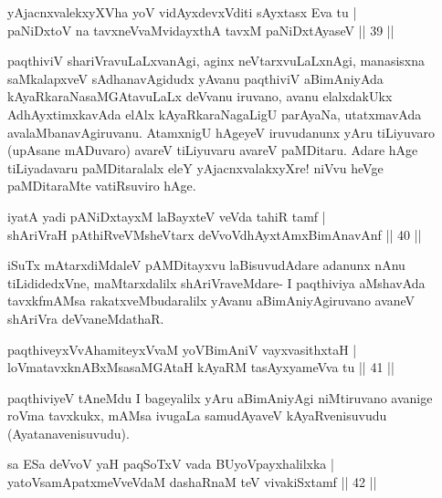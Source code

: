 \begin{shl}
yAjacnxvalekxyXVha yoV vidAyxdevxVditi sAyxtasx Eva tu |\\
paNiDxtoV na tavxneVvaMvidayxthA tavxM paNiDxtAyaseV \hfill || 39 ||
\end{shl}

\begin{artha}
paqthiviV shariVravuLaLxvanAgi, aginx neVtarxvuLaLxnAgi, manasisxna saMkalapxveV sAdhana\-vAgidudx yAvanu paqthiviV aBimAniyAda kAyaRkaraNasaMGAtavuLaLx deVvanu iruvano, avanu elalxdakUkx AdhAyxtimxkavAda elAlx kAyaRkaraNagaLigU parAyaNa, utatxmavAda avalaMbanavAgiruvanu. AtamxnigU hAgeyeV iruvudanunx yAru tiLiyuvaro (upAsane mADuvaro) avareV tiLiyuvaru avareV paMDitaru. Adare hAge tiLiyadavaru paMDitaralalx eleY yAjacnxvalakxyXre! niVvu heVge paMDita\-raMte vatiRsuviro hAge.
\end{artha}


\begin{shl}
iyatA yadi pANiDxtayxM laBayxteV veVda tahiR tamf |\\
shAriVraH pAthiRveVM\s sheV\s tarx deVvoV\s dhAyxtAmxBimAnavAnf \hfill || 40 ||
\end{shl}

\begin{artha}
iSuTx mAtarxdiMdaleV pAMDitayxvu laBisuvudAdare adanunx nAnu tiLididedxVne, maMtarxdalilx shAriVraveMdare- I paqthiviya aMshavAda tavxkfmAMsa rakatxveMbudaralilx yAvanu aBimAniyAgiruvano avaneV shAriVra deVvaneMdathaR.
\end{artha}


\begin{shl}
paqthiveyxVvAhamiteyxVvaM yoV\s BimAniV vayxvasithxtaH |\\
loVmatavxknABxMsasaMGAtaH kAyaRM tasAyxyameVva tu \hfill || 41 ||
\end{shl}

\begin{artha}
paqthiviyeV tAneMdu I bageyalilx yAru aBimAniyAgi niMtiruvano avanige roVma tavxkukx, mAMsa ivugaLa samudAyaveV kAyaRvenisuvudu (Ayatanavenisuvudu).
\end{artha}


\begin{shl}
sa ESa deVvoV yaH paqSoTxV vada BUyoV\s payxhalilxka |\\
yatoV\s samApatxmeVveVdaM dashaRnaM teV vivakiSxtamf \hfill || 42 ||
\end{shl}

